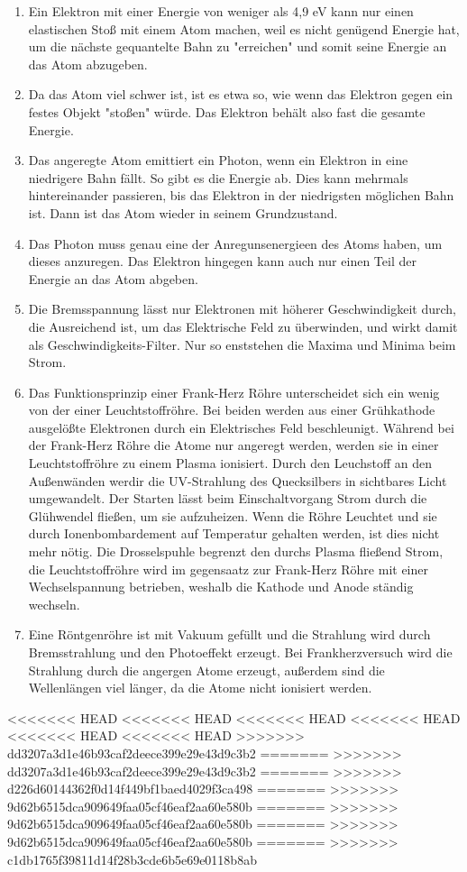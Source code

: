 \documentclass[11pt, a4paper]{article}
\begin{document}
\begin{enumerate}
        \item Ein Elektron mit einer Energie von weniger als 4,9 eV kann nur einen elastischen Stoß mit einem Atom machen, weil es nicht genügend Energie hat, um die nächste gequantelte Bahn zu "erreichen" und somit seine Energie an das Atom abzugeben.
        \item Da das Atom viel schwer ist, ist es etwa so, wie wenn das Elektron gegen ein festes Objekt "stoßen" würde. Das Elektron behält also fast die gesamte Energie.
        \item Das angeregte Atom emittiert ein Photon, wenn ein Elektron in eine niedrigere Bahn fällt. So gibt es die Energie ab. Dies kann mehrmals hintereinander passieren, bis das Elektron in der niedrigsten möglichen Bahn ist. Dann ist das Atom wieder in seinem Grundzustand.
        \item Das Photon muss genau eine der Anregunsenergieen des Atoms haben, um dieses anzuregen. Das Elektron hingegen kann auch nur einen Teil der Energie an das Atom abgeben.
        \item Die Bremsspannung lässt nur Elektronen mit höherer Geschwindigkeit durch, die Ausreichend ist, um das Elektrische Feld zu überwinden, und wirkt damit als Geschwindigkeits-Filter. Nur so enststehen die Maxima und Minima beim Strom.
        \item Das Funktionsprinzip einer Frank-Herz Röhre unterscheidet sich ein wenig von der einer Leuchtstoffröhre. Bei beiden werden aus einer Grühkathode ausgelößte Elektronen durch ein Elektrisches Feld beschleunigt. Während bei der Frank-Herz Röhre die Atome nur angeregt werden, werden sie in einer Leuchtstoffröhre zu einem Plasma ionisiert. Durch den Leuchstoff an den Außenwänden werdir die UV-Strahlung des Quecksilbers in sichtbares Licht umgewandelt. Der Starten lässt beim Einschaltvorgang Strom durch die Glühwendel fließen, um sie aufzuheizen. Wenn die Röhre Leuchtet und sie durch Ionenbombardement auf Temperatur gehalten werden, ist dies nicht mehr nötig. Die Drosselspuhle begrenzt den durchs Plasma fließend Strom, die Leuchtstoffröhre wird im gegensaatz zur Frank-Herz Röhre mit einer Wechselspannung betrieben, weshalb die Kathode und Anode ständig wechseln.
        \item Eine Röntgenröhre ist mit Vakuum gefüllt und die Strahlung wird durch Bremsstrahlung und den Photoeffekt erzeugt. Bei Frankherzversuch wird die Strahlung durch die angergen Atome erzeugt, außerdem sind die Wellenlängen viel länger, da die Atome nicht ionisiert werden. 
        
        
    \end{enumerate}

        

<<<<<<< HEAD
<<<<<<< HEAD
<<<<<<< HEAD
<<<<<<< HEAD
<<<<<<< HEAD
<<<<<<< HEAD
>>>>>>> dd3207a3d1e46b93caf2deece399e29e43d9c3b2
=======
>>>>>>> dd3207a3d1e46b93caf2deece399e29e43d9c3b2
=======
>>>>>>> d226d60144362f0d14f449bf1baed4029f3ca498
=======
>>>>>>> 9d62b6515dca909649faa05cf46eaf2aa60e580b
=======
>>>>>>> 9d62b6515dca909649faa05cf46eaf2aa60e580b
=======
>>>>>>> 9d62b6515dca909649faa05cf46eaf2aa60e580b
=======
>>>>>>> c1db1765f39811d14f28b3cde6b5e69e0118b8ab
    
    
\end{document}
